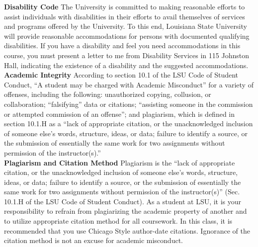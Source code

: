 \documentclass[11pt,article,oneside]{memoir}
\begin{document}
\noindent \textbf{Disability Code}
The University is committed to making reasonable efforts to assist individuals with disabilities in
their efforts to avail themselves of services and programs offered by the University. To this end,
Louisiana State University will provide reasonable accommodations for persons with
documented qualifying disabilities. If you have a disability and feel you need accommodations in
this course, you must present a letter to me from Disability Services in 115 Johnston Hall,
indicating the existence of a disability and the suggested accommodations.\\

\noindent \textbf{Academic Integrity}
According to section 10.1 of the LSU Code of Student Conduct, ``A student may be charged with Academic Misconduct'' for a variety of offenses, including the following: unauthorized copying, collusion, or collaboration; ``falsifying'' data or citations; ``assisting someone in the commission or attempted commission of an offense''; and plagiarism, which is defined in section 10.1.H as a ``lack of appropriate citation, or the unacknowledged inclusion of someone else's words, structure, ideas, or data; failure to identify a source, or the submission of essentially the same work for two assignments without permission of the instructor(s).''\\

\noindent \textbf{Plagiarism and Citation Method}
Plagiarism is the ``lack of appropriate citation, or the unacknowledged inclusion of someone else's words, structure, ideas, or data; failure to identify a source, or the submission of essentially the same work for two assignments without permission of the instructor(s)'' (Sec. 10.1.H of the LSU Code of Student Conduct). As a student at LSU, it is your responsibility to refrain from plagiarizing the academic property of another and to utilize appropriate citation method for all coursework. In this class, it is recommended that you use Chicago Style author-date citations. Ignorance of the citation method is not an excuse for academic misconduct.\\ 

\end{document}
